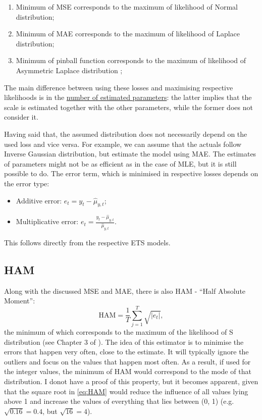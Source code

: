\documentclass[
]{book}
\providecommand{\tightlist}{%
  \setlength{\itemsep}{0pt}\setlength{\parskip}{0pt}}
\theoremstyle{definition}
\theoremstyle{definition}
\theoremstyle{definition}
\theoremstyle{definition}
\theoremstyle{remark}
\begin{document}
\begin{enumerate}
\def\labelenumi{\arabic{enumi}.}
\tightlist
\item
  Minimum of MSE corresponds to the maximum of likelihood of Normal distribution;
\item
  Minimum of MAE corresponds to the maximum of likelihood of Laplace distribution;
\item
  Minimum of pinball function \citep[quantile regression]{Koenker1978} corresponds to the maximum of likelihood of Asymmetric Laplace distribution \citep{Yu2005};
\end{enumerate}

The main difference between using these losses and maximising respective likelihoods is in the \protect\hyperlink{statisticsNumberOfParameters}{number of estimated parameters}: the latter implies that the scale is estimated together with the other parameters, while the former does not consider it.

Having said that, the assumed distribution does not necessarily depend on the used loss and vice versa. For example, we can assume that the actuals follow Inverse Gaussian distribution, but estimate the model using MAE. The estimates of parameters might not be as efficient as in the case of MLE, but it is still possible to do. The error term, which is minimised in respective losses depends on the error type:

\begin{itemize}
\tightlist
\item
  Additive error: \(e_t = y_t - \hat{\mu}_{y,t}\);
\item
  Multiplicative error: \(e_t = \frac{y_t - \hat{\mu}_{y,t}}{\hat{\mu}_{y,t}}\).
\end{itemize}

This follows directly from the respective ETS models.

\hypertarget{ham}{%
\subsection{HAM}\label{ham}}

Along with the discussed MSE and MAE, there is also HAM - ``Half Absolute Moment'':
\begin{equation}
  \mathrm{HAM} = \frac{1}{T} \sum_{j=1}^T \sqrt{\left|e_t\right|},
  \label{eq:HAM}
\end{equation}
the minimum of which corresponds to the maximum of the likelihood of S distribution (see Chapter 3 of \citet{SvetunkovSBA}). The idea of this estimator is to minimise the errors that happen very often, close to the estimate. It will typically ignore the outliers and focus on the values that happen most often. As a result, if used for the integer values, the minimum of HAM would correspond to the mode of that distribution. I donot have a proof of this property, but it becomes apparent, given that the square root in \eqref{eq:HAM} would reduce the influence of all values lying above 1 and increase the values of everything that lies between (0, 1) (e.g.~\(\sqrt{0.16}=0.4\), but \(\sqrt{16}=4\)).
\end{document}
